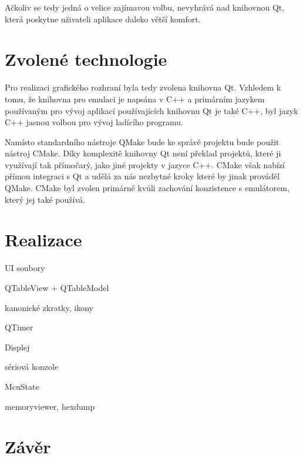 Ačkoliv se tedy jedná o velice zajímavou volbu, nevyhrává nad knihovnou Qt, která poskytne uživateli aplikace daleko větší komfort.

\section{Zvolené technologie}

Pro realizaci grafického rozhraní byla tedy zvolena knihovna Qt. Vzhledem k tomu, že knihovna pro emulaci je napsána v C++ a primárním jazykem používaným pro vývoj aplikací používajících knihovnu Qt je také C++, byl jazyk C++ jasnou volbou pro vývoj ladícího programu. 

Namísto standardního nástroje QMake bude ke správě projektu bude použit nástroj CMake. Díky komplexitě knihovny Qt není překlad projektů, které ji využívají tak přímočarý, jako jiné projekty v jazyce C++. CMake však nabízí přímou integraci s Qt a udělá za nás nezbytné kroky které by jinak prováděl QMake. CMake byl zvolen primárně kvůli zachování konzistence s emulátorem, který jej také používá.

\section{Realizace}

UI soubory

QTableView + QTableModel

kanonické zkratky, ikony

QTimer

Displej

sériová konzole

McuState

memoryviewer, hexdump


\section{Závěr}

\blind[1]